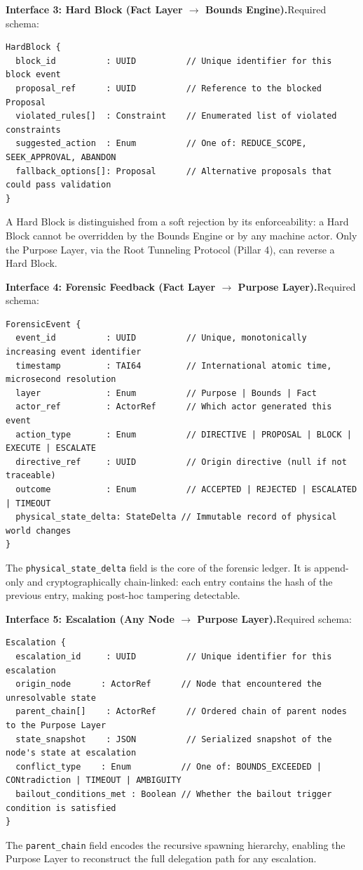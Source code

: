 \documentclass[12pt]{article}
\theoremstyle{plain}
\begin{document}
\vspace{0.5em}
\noindent\textbf{Interface 3: Hard Block (Fact Layer $\rightarrow$ Bounds Engine).}\hspace{1em}Required schema:
\begin{verbatim}
HardBlock {
  block_id          : UUID          // Unique identifier for this block event
  proposal_ref      : UUID          // Reference to the blocked Proposal
  violated_rules[]  : Constraint    // Enumerated list of violated constraints
  suggested_action  : Enum          // One of: REDUCE_SCOPE, SEEK_APPROVAL, ABANDON
  fallback_options[]: Proposal      // Alternative proposals that could pass validation
}
\end{verbatim}
A Hard Block is distinguished from a soft rejection by its enforceability: a Hard Block cannot be overridden by the Bounds Engine or by any machine actor. Only the Purpose Layer, via the Root Tunneling Protocol (Pillar 4), can reverse a Hard Block.

\vspace{0.5em}
\noindent\textbf{Interface 4: Forensic Feedback (Fact Layer $\rightarrow$ Purpose Layer).}\hspace{1em}Required schema:
\begin{verbatim}
ForensicEvent {
  event_id          : UUID          // Unique, monotonically increasing event identifier
  timestamp         : TAI64         // International atomic time, microsecond resolution
  layer             : Enum          // Purpose | Bounds | Fact
  actor_ref         : ActorRef      // Which actor generated this event
  action_type       : Enum          // DIRECTIVE | PROPOSAL | BLOCK | EXECUTE | ESCALATE
  directive_ref     : UUID          // Origin directive (null if not traceable)
  outcome           : Enum          // ACCEPTED | REJECTED | ESCALATED | TIMEOUT
  physical_state_delta: StateDelta // Immutable record of physical world changes
}
\end{verbatim}
The \texttt{physical\_state\_delta} field is the core of the forensic ledger. It is append-only and cryptographically chain-linked: each entry contains the hash of the previous entry, making post-hoc tampering detectable.

\vspace{0.5em}
\noindent\textbf{Interface 5: Escalation (Any Node $\rightarrow$ Purpose Layer).}\hspace{1em}Required schema:
\begin{verbatim}
Escalation {
  escalation_id     : UUID          // Unique identifier for this escalation
  origin_node      : ActorRef      // Node that encountered the unresolvable state
  parent_chain[]    : ActorRef      // Ordered chain of parent nodes to the Purpose Layer
  state_snapshot    : JSON          // Serialized snapshot of the node's state at escalation
  conflict_type    : Enum          // One of: BOUNDS_EXCEEDED | CONtradiction | TIMEOUT | AMBIGUITY
  bailout_conditions_met : Boolean // Whether the bailout trigger condition is satisfied
}
\end{verbatim}
The \texttt{parent\_chain} field encodes the recursive spawning hierarchy, enabling the Purpose Layer to reconstruct the full delegation path for any escalation.
\end{document}

